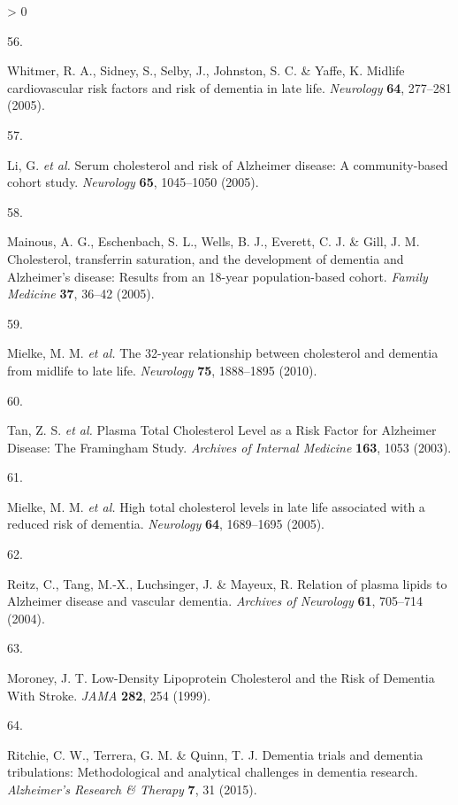 \documentclass[a4paper, twoside]{templates/ociamthesis}
\newlength{\cslhangindent}
\newlength{\csllabelwidth}
\newenvironment{CSLReferences}[3] %
 {%
  \setlength{\parindent}{0pt}
  \ifodd #1 \everypar{\setlength{\hangindent}{\cslhangindent}}\ignorespaces\fi
  \ifnum #2 > 0
  \setlength{\parskip}{#2\baselineskip}
  \fi
 }%
 {}
\newcommand{\CSLLeftMargin}[1]{\parbox[t]{\maxof{\widthof{#1}}{\csllabelwidth}}{#1}}
\newcommand{\CSLRightInline}[1]{\parbox[t]{\linewidth - \csllabelwidth}{#1}}
\begin{document}
\begin{CSLReferences}{0}{0}
\leavevmode\hypertarget{ref-whitmer2005}{}%
\CSLLeftMargin{56. }
\CSLRightInline{Whitmer, R. A., Sidney, S., Selby, J., Johnston, S. C. \& Yaffe, K. Midlife cardiovascular risk factors and risk of dementia in late life. \emph{Neurology} \textbf{64}, 277--281 (2005).}

\leavevmode\hypertarget{ref-li2005}{}%
\CSLLeftMargin{57. }
\CSLRightInline{Li, G. \emph{et al.} Serum cholesterol and risk of {Alzheimer} disease: A community-based cohort study. \emph{Neurology} \textbf{65}, 1045--1050 (2005).}

\leavevmode\hypertarget{ref-mainous2005}{}%
\CSLLeftMargin{58. }
\CSLRightInline{Mainous, A. G., Eschenbach, S. L., Wells, B. J., Everett, C. J. \& Gill, J. M. Cholesterol, transferrin saturation, and the development of dementia and {Alzheimer}'s disease: Results from an 18-year population-based cohort. \emph{Family Medicine} \textbf{37}, 36--42 (2005).}

\leavevmode\hypertarget{ref-mielke2010}{}%
\CSLLeftMargin{59. }
\CSLRightInline{Mielke, M. M. \emph{et al.} The 32-year relationship between cholesterol and dementia from midlife to late life. \emph{Neurology} \textbf{75}, 1888--1895 (2010).}

\leavevmode\hypertarget{ref-tan2003}{}%
\CSLLeftMargin{60. }
\CSLRightInline{Tan, Z. S. \emph{et al.} Plasma {Total Cholesterol Level} as a {Risk Factor} for {Alzheimer Disease}: The {Framingham Study}. \emph{Archives of Internal Medicine} \textbf{163}, 1053 (2003).}

\leavevmode\hypertarget{ref-mielke2005}{}%
\CSLLeftMargin{61. }
\CSLRightInline{Mielke, M. M. \emph{et al.} High total cholesterol levels in late life associated with a reduced risk of dementia. \emph{Neurology} \textbf{64}, 1689--1695 (2005).}

\leavevmode\hypertarget{ref-reitz2004}{}%
\CSLLeftMargin{62. }
\CSLRightInline{Reitz, C., Tang, M.-X., Luchsinger, J. \& Mayeux, R. Relation of plasma lipids to {Alzheimer} disease and vascular dementia. \emph{Archives of Neurology} \textbf{61}, 705--714 (2004).}

\leavevmode\hypertarget{ref-moroney1999}{}%
\CSLLeftMargin{63. }
\CSLRightInline{Moroney, J. T. Low-{Density Lipoprotein Cholesterol} and the {Risk} of {Dementia With Stroke}. \emph{JAMA} \textbf{282}, 254 (1999).}

\leavevmode\hypertarget{ref-ritchie2015}{}%
\CSLLeftMargin{64. }
\CSLRightInline{Ritchie, C. W., Terrera, G. M. \& Quinn, T. J. Dementia trials and dementia tribulations: Methodological and analytical challenges in dementia research. \emph{Alzheimer's Research \& Therapy} \textbf{7}, 31 (2015).}


\end{CSLReferences}
\end{document}
